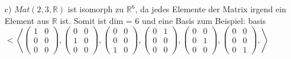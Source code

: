 \documentclass{article}
\begin{document}
\begin{enumerate}
        \item[c)]
        $Mat(2,3,\mathbb{R})$ ist isomorph zu $\mathbb{R}^6$, da jedes 
        Elemente der Matrix irgend ein Element aus $\mathbb{R}$ ist.
        Somit ist dim = 6 und eine Basis zum Beispiel:
        \newline
        basis$<\left<
        \left(\begin{array}{cc}1&0\\0&0\\0&0\end{array}\right),
        \left(\begin{array}{cc}0&0\\1&0\\0&0\end{array}\right),
        \left(\begin{array}{cc}0&0\\0&0\\1&0\end{array}\right),
        \left(\begin{array}{cc}0&1\\0&0\\0&0\end{array}\right),
        \left(\begin{array}{cc}0&0\\0&1\\0&0\end{array}\right),
        \left(\begin{array}{cc}0&0\\0&0\\0&1\end{array}\right),\right>$


\end{enumerate}
\end{document}
